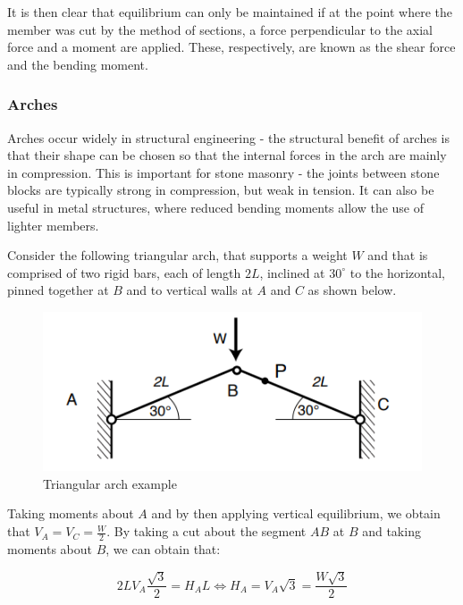 \documentclass{article}
\begin{document}
\begin{definition}
    It is then clear that equilibrium can only be maintained if at the point where the member was cut by the method of sections, a force perpendicular to the axial force and a moment are applied. These, respectively, are known as the shear force and the bending moment.
\end{definition}

\subsubsection{Arches}

Arches occur widely in structural engineering - the structural benefit of arches is that their shape can be chosen so that the internal forces in the arch are mainly in compression. This is important for stone masonry - the joints between stone blocks are typically strong in compression, but weak in tension. It can also be useful in metal structures, where reduced bending moments allow the use of lighter members.

\begin{example}
    Consider the following triangular arch, that supports a weight $W$ and that is comprised of two rigid bars, each of length $2L$, inclined at $30^\circ$ to the horizontal, pinned together at $B$ and to vertical walls at $A$ and $C$ as shown below.

    \begin{figure}[h]
        \centering
        \includegraphics{images/arch.png}
        \caption{Triangular arch example}
        \label{fig:enter-label}
    \end{figure}

    Taking moments about $A$ and by then applying vertical equilibrium, we obtain that $V_A = V_C = \frac{W}{2}$. By taking a cut about the segment $AB$ at $B$ and taking moments about $B$, we can obtain that:

    \[ 2LV_A\frac{\sqrt{3}}{2} = H_AL \iff H_A = V_A\sqrt{3} = \frac{W\sqrt{3}}{2} \]
\end{example}
\end{document}
